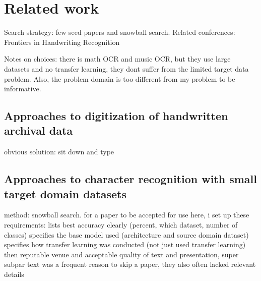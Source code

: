 \documentclass{article}
\begin{document}

\section{Related work}


Search strategy: few seed papers and snowball search. Related conferences: 
Frontiers in Handwriting Recognition

Notes on choices: there is math OCR and music OCR, but they use large datasets and no transfer learning, they dont suffer from the limited target data problem. Also, the problem domain is too different from my problem to be informative.

\subsection{Approaches to digitization of handwritten archival data}

obvious solution: sit down and type

\subsection{Approaches to character recognition with small target domain datasets}

method: snowball search. for a paper to be accepted for use here, i set up these requirements:
lists best accuracy clearly (percent, which dataset, number of classes)
specifies the base model used (architecture and source domain dataset)
specifies how transfer learning was conducted (not just used transfer learning)
then reputable venue and acceptable quality of text and presentation, super subpar text was a frequent reason to skip a paper, they also often lacked relevant details
\end{document}
